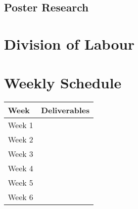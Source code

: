 \documentclass{article}
\begin{document}
\subsection{Poster Research} %

\section{Division of Labour} %

\section{Weekly Schedule} %

\begin{tabular}{ l | l }
  \textbf{Week} & \textbf{Deliverables} \\
  \hline
  \hline
  Week 1 & \\
  Week 2 & \\
  Week 3 & \\
  Week 4 & \\
  Week 5 & \\
  Week 6 & \\
\end{tabular}

\end{document}
